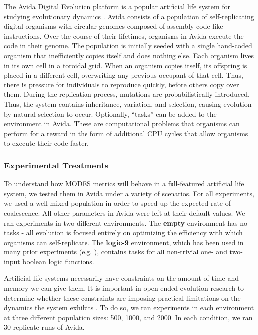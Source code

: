 \documentclass[letterpaper]{article}
\begin{document}
The Avida Digital Evolution platform is a popular artificial life system for studying evolutionary dynamics \citep{ofria_avida:_2004}. Avida consists of a population of self-replicating digital organisms with circular genomes composed of assembly-code-like instructions. Over the course of their lifetimes, organisms in Avida execute the code in their genome. The population is initially seeded with a single hand-coded organism that inefficiently copies itself and does nothing else. Each organism lives in its own cell in a toroidal grid. When an organism copies itself, its offspring is placed in a different cell, overwriting any previous occupant of that cell. Thus, there is pressure for individuals to reproduce quickly, before others copy over them. During the replication process, mutations are probabilistically introduced. Thus, the system contains inheritance, variation, and selection, causing evolution by natural selection to occur. Optionally, ``tasks'' can be added to the environment in Avida. These are computational problems that organisms can perform for a reward in the form of additional CPU cycles that allow organisms to execute their code faster.

\subsubsection{Experimental Treatments}
To understand how MODES metrics will behave in a full-featured artificial life system, we tested them in Avida under a variety of scenarios. For all experiments, we used a well-mixed population in order to speed up the expected rate of coalescence. All other parameters in Avida were left at their default values. We ran experiments in two different environments. The \textbf{empty} environment has no tasks - all evolution is focused entirely on optimizing the efficiency with which organisms can self-replicate. The \textbf{logic-9} environment, which has been used in many prior experiments (e.g. \citep{lenski_evolutionary_2003}), contains tasks for all non-trivial one- and two-input boolean logic functions.

Artificial life systems necessarily have constraints on the amount of time and memory we can give them. It is important in open-ended evolution research to determine whether these constraints are imposing practical limitations on the dynamics the system exhibits \citep{zaman_investigating_2018}. To do so, we ran experiments in each environment at three different population sizes: 500, 1000, and 2000. In each condition, we ran 30 replicate runs of Avida.
\end{document}

